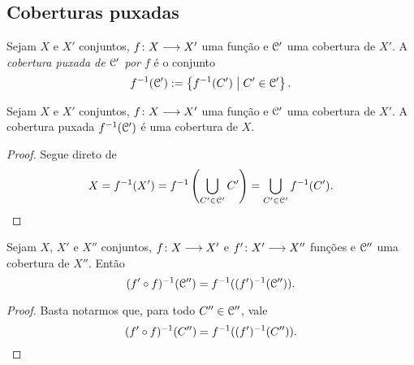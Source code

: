 
\subsection{Coberturas puxadas}

\begin{definition}
Sejam $X$ e $X'$ conjuntos, ${f}\colon {X} \longrightarrow {X'}$ uma função e $\mathcal{C}'$ uma cobertura de $X'$. A \emph{cobertura puxada de $\mathcal{C}'$ por $f$} é o conjunto
	\begin{equation*}
	f^{-1}(\mathcal{C}') := \left\{{f^{-1}(C')}\;\middle\vert\;{C' \in \mathcal{C}'}\right\}.
	\end{equation*}
\end{definition}

\begin{proposition}
\label{prop:cobertura.puxada.propriedades}
Sejam $X$ e $X'$ conjuntos, ${f}\colon {X} \longrightarrow {X'}$ uma função e $\mathcal{C}'$ uma cobertura de $X'$. A cobertura puxada $f^{-1}(\mathcal{C}')$ é uma cobertura de $X$.
\end{proposition}
\begin{proof}
Segue direto de
	\begin{equation*}
	X = f^{-1}(X') = f^{-1} \left( \bigcup_{C' \in \mathcal{C}'} C' \right) = \bigcup_{C' \in \mathcal{C}'} f^{-1}(C').
	\qedhere
	\end{equation*}
\end{proof}

\begin{proposition}
Sejam $X$, $X'$ e $X''$ conjuntos, ${f}\colon {X} \longrightarrow {X'}$ e ${f'}\colon {X'} \longrightarrow {X''}$ funções e $\mathcal{C}''$ uma cobertura de $X''$. Então
	\begin{equation*}
	(f' \circ f)^{-1} (\mathcal{C}'') = f^{-1} ((f')^{-1}(\mathcal{C}'')).
	\end{equation*}
\end{proposition}
\begin{proof}
Basta notarmos que, para todo $C'' \in \mathcal{C}''$, vale
	\begin{equation*}
	(f' \circ f)^{-1}(C'') = f^{-1} ((f')^{-1}(C'')).
	\qedhere
	\end{equation*}
\end{proof}

